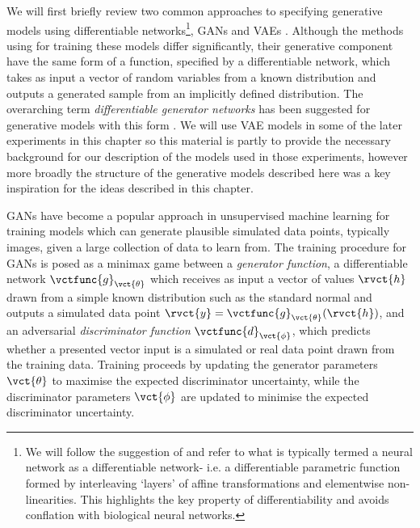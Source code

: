 We will first briefly review two common approaches to specifying generative models using differentiable networks\footnote{We will follow the suggestion of \citep{zadeh2016twitter} and refer to what is typically termed a neural network as a differentiable network- i.e. a differentiable parametric function formed by interleaving `layers' of affine transformations and elementwise non-linearities. This highlights the key property of differentiability and avoids conflation with biological neural networks.}, \acfp{GAN} \citep{goodfellow2014generative} and \acfp{VAE} \citep{kingma2013auto,rezende2014stochastic}. Although the methods using for training these models differ significantly, their generative component have the same form of a function, specified by a differentiable network, which takes as input a vector of random variables from a known distribution and outputs a generated sample from an implicitly defined distribution. The overarching term \emph{differentiable generator networks} has been suggested for generative models with this form \citep{goodfellow2016deep}. We will use \ac{VAE} models in some of the later experiments in this chapter so this material is partly to provide the necessary background for our description of the models used in those experiments, however more broadly the structure of the generative models described here was a key inspiration for the ideas described in this chapter.

\acp{GAN} \citep{goodfellow2014generative} have become a popular approach in unsupervised machine learning for training models which can generate plausible simulated data points, typically images, given a large collection of data to learn from. The training procedure for \acp{GAN} is posed as a minimax game between a \emph{generator function}, a differentiable network $\vctfunc{g}_{\vct{\theta}}$ which receives as input a vector of values $\rvct{h}$ drawn from a simple known distribution such as the standard normal and outputs a simulated data point $\rvct{y} = \vctfunc{g}_{\vct{\theta}}(\rvct{h})$, and an adversarial \emph{discriminator function} $\vctfunc{d}_{\vct{\phi}}$, which predicts whether a presented vector input is a simulated or real data point drawn from the training data.  Training proceeds by updating the generator parameters $\vct{\theta}$ to maximise the expected discriminator uncertainty, while the discriminator parameters $\vct{\phi}$ are updated to minimise the expected discriminator uncertainty.

